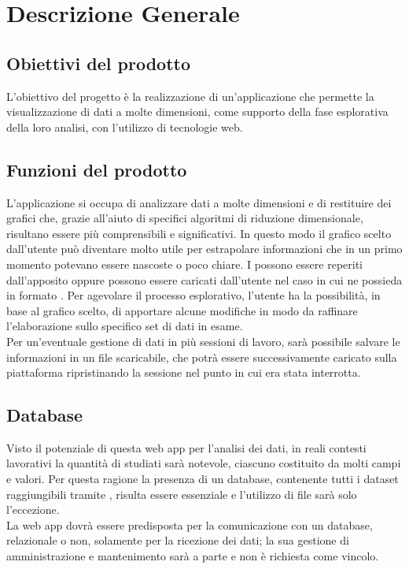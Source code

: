 \section{Descrizione Generale}
\subsection{Obiettivi del prodotto}
L'obiettivo del progetto è la realizzazione di un'applicazione che permette la visualizzazione di dati a molte dimensioni, come supporto della fase esplorativa della loro analisi, con l'utilizzo di tecnologie web.
\subsection{Funzioni del prodotto}
L'applicazione si occupa di analizzare dati a molte dimensioni e di restituire dei grafici che, grazie all'aiuto di specifici algoritmi di riduzione dimensionale, risultano essere più comprensibili e significativi. In questo modo il grafico scelto dall'utente può diventare molto utile per estrapolare informazioni che in un primo momento potevano essere nascoste o poco chiare. I  possono essere reperiti dall'apposito  oppure possono essere caricati dall'utente nel caso in cui ne possieda in formato . Per agevolare il processo esplorativo, l'utente ha la possibilità, in base al grafico scelto, di apportare alcune modifiche in modo da raffinare l'elaborazione sullo specifico set di dati in esame.\\ Per un'eventuale gestione di dati in più sessioni di lavoro, sarà possibile salvare le informazioni in un file scaricabile, che potrà essere successivamente caricato sulla piattaforma ripristinando la sessione nel punto in cui era stata interrotta.

\subsection{Database}
Visto il potenziale di questa web app per l'analisi dei dati, in reali contesti lavorativi la quantità di  studiati sarà notevole, ciascuno costituito da molti campi e valori. Per questa ragione la presenza di un database, contenente tutti i dataset raggiungibili tramite , risulta essere essenziale e l'utilizzo di file  sarà solo l'eccezione. \\
La web app dovrà essere predisposta per la comunicazione con un database, relazionale o non, solamente per la ricezione dei dati; la sua gestione di amministrazione e mantenimento sarà a parte e non è richiesta come vincolo.

